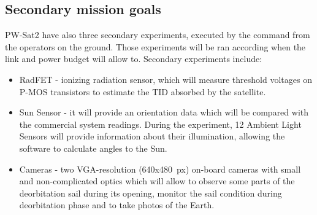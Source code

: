 \subsection{Secondary mission goals}
PW-Sat2 have also three secondary experiments, executed by the command from the operators on the ground. Those experiments will be ran according when the link and power budget will allow to. Secondary experiments include:
\begin{itemize}
    \item RadFET - ionizing radiation sensor, which will measure threshold voltages on P-MOS transistors to estimate the TID absorbed by the satellite.
    \item Sun Sensor -  it will provide an orientation data which will be compared with the commercial system readings. During the experiment, \si{12} Ambient Light Sensors will provide information about their illumination, allowing the software to calculate angles to the Sun.
    \item Cameras - two VGA-resolution (\si{640}x\si{480}~px) on-board cameras with small and non-complicated optics which will allow to observe some parts of the deorbitation sail during its opening, monitor the sail condition during deorbitation phase and to take photos of the Earth.
\end{itemize}


